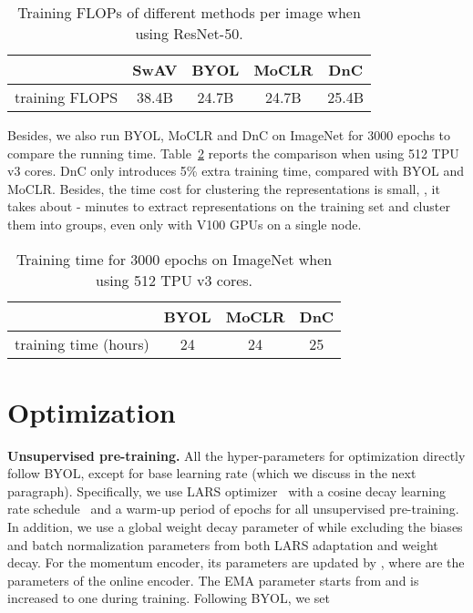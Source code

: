\documentclass[final]{cvpr}
\begin{document}
\begin{table}[t]
\caption{Training FLOPs of different methods per image when using ResNet-50.}
\label{tab:flops}
\setlength{\tabcolsep}{4.5pt}
\begin{center}
\begin{small}
\begin{tabular}{c|cccc}
\toprule
               & SwAV  & BYOL  & MoCLR & DnC \\
\midrule
training FLOPS & 38.4B & 24.7B & 24.7B & 25.4B \\
\bottomrule
\end{tabular}
\end{small}
\end{center}
\end{table}

Besides, we also run BYOL, MoCLR and DnC on ImageNet for 3000 epochs to compare the running time. Table~\ref{tab:time} reports the comparison when using 512 TPU v3 cores. DnC only introduces 5\% extra training time, compared with BYOL and MoCLR. Besides, the time cost for clustering the representations is small, \eg, it takes about - minutes to extract representations on the training set and cluster them into groups, even only with  V100 GPUs on a single node.

\begin{table}[h]
\caption{Training time for 3000 epochs on ImageNet when using 512 TPU v3 cores.}
\label{tab:time}
\setlength{\tabcolsep}{4.5pt}
\begin{center}
\begin{small}
\begin{tabular}{c|ccc}
\toprule
                     & BYOL  & MoCLR & DnC \\
\midrule
training time (hours) & 24 & 24 & 25 \\
\bottomrule
\end{tabular}
\end{small}
\end{center}
\end{table}


\section{Optimization}

\noindent\textbf{Unsupervised pre-training.} All the hyper-parameters for optimization directly follow BYOL, except for base learning rate (which we discuss in the next paragraph). Specifically, we use LARS optimizer~\cite{LARS} with a cosine decay learning rate schedule~\cite{SGDR} and a warm-up period of  epochs for all unsupervised pre-training. 
In addition, we use a global weight decay parameter of  while excluding the biases and batch normalization parameters from both LARS adaptation and weight decay. For the momentum encoder, its parameters  are updated by , where  are the parameters of the online encoder. The EMA parameter  starts from  and is increased to one during training. Following BYOL, we set 
\vspace{-3pt}
\end{document}
